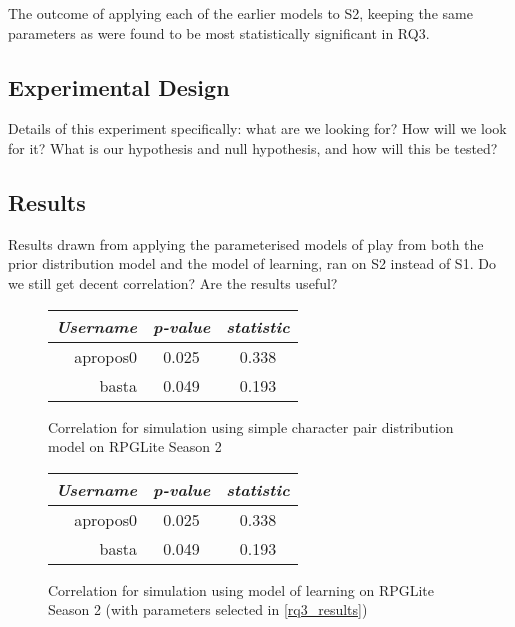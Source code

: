 The outcome of applying each of the earlier models to S2, keeping the same
parameters as were found to be most statistically significant in RQ3.

\subsection{Experimental Design}

Details of this experiment specifically: what are we looking for? How will we
look for it? What is our hypothesis and null hypothesis, and how will this be
tested?

\subsection{Results}

Results drawn from applying the parameterised models of play from both the prior
distribution model and the model of learning, ran on S2 instead of S1. Do we
still get decent correlation? Are the results useful?



\begin{figure}[h]
  \centering
  
  \begin{minipage}{.45\textwidth}
  \centering
  \begin{tabular}{r|c|c}
    \emph{Username} & \emph{p-value} & \emph{\tau{} statistic} \\\hline\hline
    apropos0 & 0.025 & 0.338 \\
    basta & 0.049 & 0.193 \\
  \end{tabular}
  \caption{Correlation for simulation using simple character pair distribution model on RPGLite Season 2}
  \label{prior_distribution_model_results_s2}
  \end{minipage}\hfill
  \begin{minipage}{.45\textwidth}
  \centering
  \begin{tabular}{r|c|c}
    \emph{Username} & \emph{p-value} & \emph{\tau{} statistic} \\\hline\hline
    apropos0 & 0.025 & 0.338 \\
    basta & 0.049 & 0.193 \\
  \end{tabular}
  \caption{Correlation for simulation using \aspectoriented model of learning on RPGLite Season 2 (with parameters selected in \cref{rq3_results})}
  \label{learning_model_results_s2}
  \end{minipage}
  

\end{figure}





